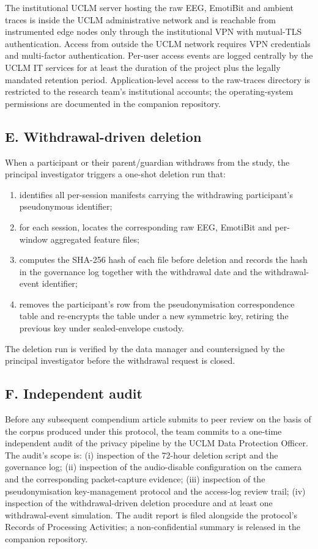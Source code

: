 The institutional UCLM server hosting the raw EEG, EmotiBit and ambient traces is inside the UCLM administrative network and is reachable from instrumented edge nodes only through the institutional VPN with mutual-TLS authentication. Access from outside the UCLM network requires VPN credentials and multi-factor authentication. Per-user access events are logged centrally by the UCLM IT services for at least the duration of the project plus the legally mandated retention period. Application-level access to the raw-traces directory is restricted to the research team's institutional accounts; the operating-system permissions are documented in the companion repository.

\subsection*{E. Withdrawal-driven deletion}

When a participant or their parent/guardian withdraws from the study, the principal investigator triggers a one-shot deletion run that:

\begin{enumerate}[label=E.\arabic*., leftmargin=*, itemsep=2pt]
  \item identifies all per-session manifests carrying the withdrawing participant's pseudonymous identifier;
  \item for each session, locates the corresponding raw EEG, EmotiBit and per-window aggregated feature files;
  \item computes the SHA-256 hash of each file before deletion and records the hash in the governance log together with the withdrawal date and the withdrawal-event identifier;
  \item removes the participant's row from the pseudonymisation correspondence table and re-encrypts the table under a new symmetric key, retiring the previous key under sealed-envelope custody.
\end{enumerate}

The deletion run is verified by the data manager and countersigned by the principal investigator before the withdrawal request is closed.

\subsection*{F. Independent audit}

Before any subsequent compendium article submits to peer review on the basis of the corpus produced under this protocol, the team commits to a one-time independent audit of the privacy pipeline by the UCLM Data Protection Officer. The audit's scope is: (i) inspection of the 72-hour deletion script and the governance log; (ii) inspection of the audio-disable configuration on the camera and the corresponding packet-capture evidence; (iii) inspection of the pseudonymisation key-management protocol and the access-log review trail; (iv) inspection of the withdrawal-driven deletion procedure and at least one withdrawal-event simulation. The audit report is filed alongside the protocol's Records of Processing Activities; a non-confidential summary is released in the companion repository.
